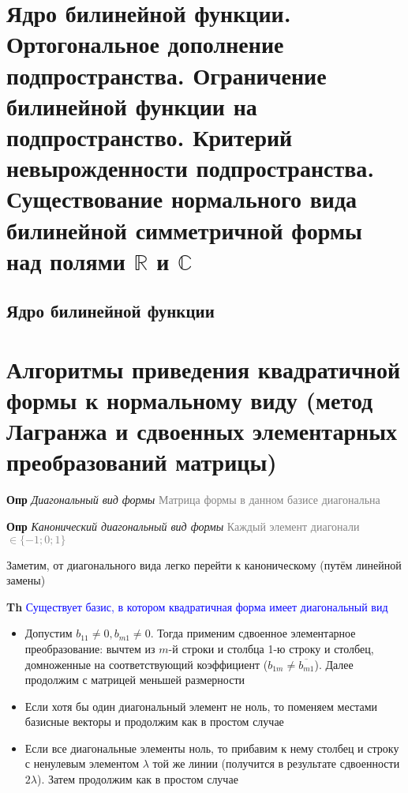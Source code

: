 \documentclass[a4paper, 14pt]{article}
\begin{document}
    \section{Ядро билинейной функции.
    Ортогональное дополнение подпространства.
    Ограничение билинейной функции на подпространство.
    Критерий невырожденности подпространства.
    Существование нормального вида билинейной симметричной формы над полями $\mathbb{R}$ и $\mathbb{C}$}
    
    \subsection{Ядро билинейной функции}
    
    \section{Алгоритмы приведения квадратичной формы к нормальному виду (метод Лагранжа и сдвоенных элементарных
    преобразований матрицы)}
    
    \textbf{Опр} \textit{Диагональный вид формы} \textcolor{gray}{Матрица формы в данном базисе диагональна}
    
    \textbf{Опр} \textit{Канонический диагональный вид формы} \textcolor{gray}{Каждый элемент диагонали $\in \{-1;0;1\}$}
    
    Заметим, от диагонального вида легко перейти к каноническому (путём линейной замены)
    
    \textbf{Th} \textcolor{blue}{Существует базис, в котором квадратичная форма имеет диагональный вид}
    
    \begin{itemize}
        \item Допустим $b_{11} \neq 0, b_{m1} \neq 0$.
        Тогда применим сдвоенное элементарное преобразование: вычтем из $m$-й строки и столбца 1-ю строку и столбец,
        домноженные на соответствующий коэффициент ($b_{1m} \neq \overline{b_{m1}}$).
        Далее продолжим с матрицей меньшей размерности
        \item Если хотя бы один диагональный элемент не ноль, то поменяем местами базисные векторы и продолжим
        как в простом случае
        \item Если все диагональные элементы ноль, то прибавим к нему столбец и строку с ненулевым элементом $\lambda$
        той же
        линии (получится в результате сдвоенности $2\lambda$). Затем продолжим как в простом случае
    \end{itemize}
    
\end{document}
